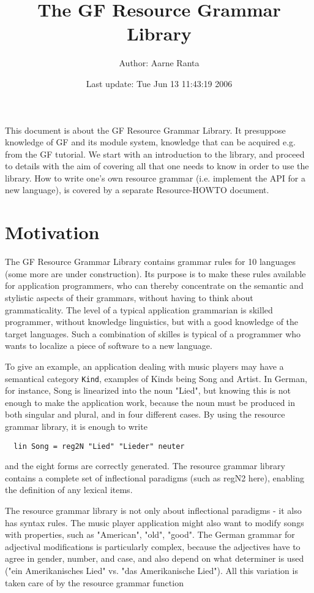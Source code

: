 \documentclass[11pt,a4paper]{article}
\title{The GF Resource Grammar Library}
\author{Author: Aarne Ranta}
\begin{document}
\date{Last update: Tue Jun 13 11:43:19 2006}
\maketitle

\tableofcontents

\clearpage


This document is about the 
GF Resource Grammar Library. It presuppose knowledge of GF and its
module system, knowledge that can be acquired e.g. from the GF
tutorial. We start with an introduction to the library, and proceed to
details with the aim of covering all that one needs to know 
in order to use the library. 
How to write one's own resource grammar (i.e. implement the API for
a new language), is covered by a separate Resource-HOWTO document.

\section{Motivation}
The GF Resource Grammar Library contains grammar rules for
10 languages (some more are under construction). Its purpose
is to make these rules available for application programmers,
who can thereby concentrate on the semantic and stylistic
aspects of their grammars, without having to think about 
grammaticality. The level of a typical application grammarian
is skilled programmer, without knowledge linguistics, but with
a good knowledge of the target languages. Such a combination of
skilles is typical of a programmer who wants to localize a piece
of software to a new language.

To give an example, an application dealing with
music players may have a semantical category \texttt{Kind}, examples
of Kinds being Song and Artist. In German, for instance, Song 
is linearized into the noun "Lied", but knowing this is not
enough to make the application work, because the noun must be 
produced in both singular and plural, and in four different
cases. By using the resource grammar library, it is enough to
write

\begin{verbatim}
  lin Song = reg2N "Lied" "Lieder" neuter
\end{verbatim}
and the eight forms are correctly generated. The resource grammar
library contains a complete set of inflectional paradigms (such as
regN2 here), enabling the definition of any lexical items.

The resource grammar library is not only about inflectional paradigms - it
also has syntax rules. The music player application
might also want to modify songs with properties, such as "American",
"old", "good". The German grammar for adjectival modifications is
particularly complex, because the adjectives have to agree in gender,
number, and case, and also depend on what determiner is used
("ein Amerikanisches Lied" vs. "das Amerikanische Lied"). All this
variation is taken care of by the resource grammar function
\end{document}
